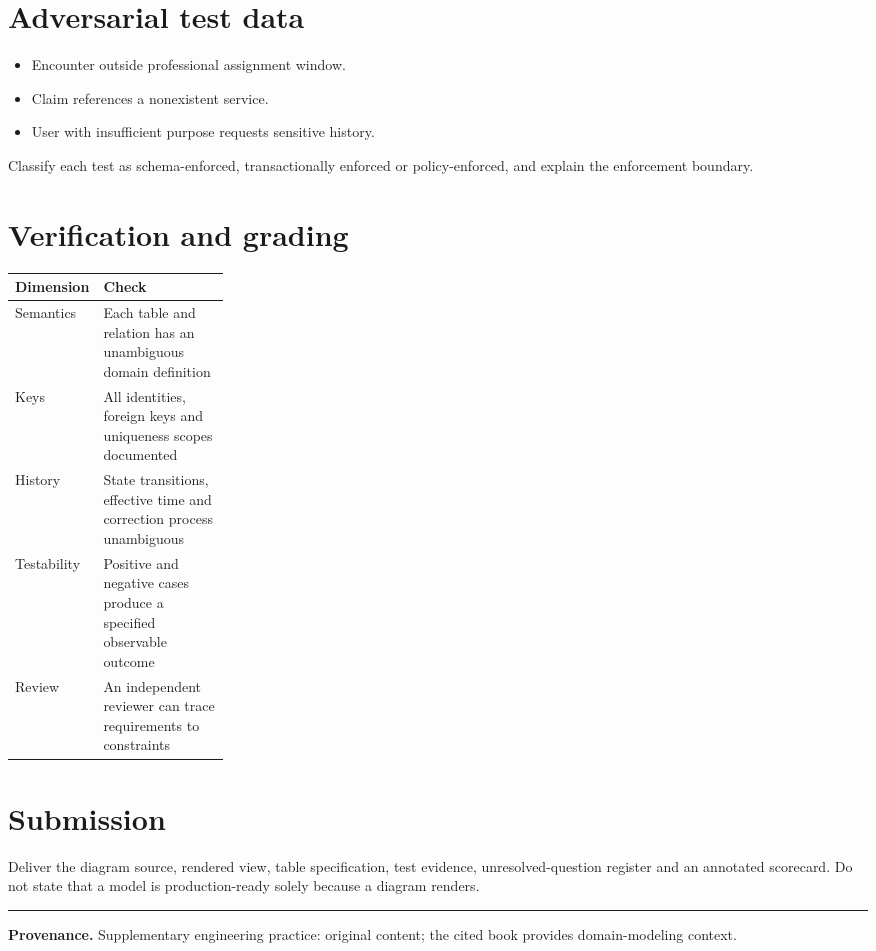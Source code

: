 \documentclass[11pt,letterpaper]{article}
\begin{document}
\section{Adversarial test data}
\begin{itemize}
\item Encounter outside professional assignment window.
\item Claim references a nonexistent service.
\item User with insufficient purpose requests sensitive history.
\end{itemize}
Classify each test as schema-enforced, transactionally enforced or policy-enforced, and explain the enforcement boundary.


\section{Verification and grading}
\begin{tabularx}{\linewidth}{@{}>{\raggedright\arraybackslash}p{0.25\linewidth}>{\raggedright\arraybackslash}X@{}}
\toprule
\textbf{Dimension} & \textbf{Check} \\ 
\midrule
Semantics & Each table and relation has an unambiguous domain definition \\ 
Keys & All identities, foreign keys and uniqueness scopes documented \\ 
History & State transitions, effective time and correction process unambiguous \\ 
Testability & Positive and negative cases produce a specified observable outcome \\ 
Review & An independent reviewer can trace requirements to constraints \\ 
\bottomrule
\end{tabularx}

\section{Submission}
Deliver the diagram source, rendered view, table specification, test evidence, unresolved-question register and an annotated scorecard. Do not state that a model is production-ready solely because a diagram renders.


\vfill
\hrule
{\footnotesize\textbf{Provenance.} Supplementary engineering practice: original content; the cited book provides domain-modeling context.}
\end{document}
